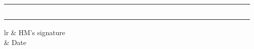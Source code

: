 \documentclass[12pt]{article}
\begin{document}
\begin{longtable}{|l|p{2.75cm}|p{2.75cm}|p{2.75cm}|l|p{1.5cm}|l|l|l|l|l|l|l|l|l|l|l|l|l|l|l|l|l|l|l|l|l|l|l|l|l|}
\rule{0cm}{0.75cm} & \relax & \relax & \relax & \relax & \relax & \relax & & & & & & & & & & & & & & & & & & & & & & & &\\ \hline
\rule{0cm}{0.75cm} & \relax & \relax & \relax & \relax & \relax & \relax & & & & & & & & & & & & & & & & & & & & & & & &\\ \hline
\rule{0cm}{0.75cm} & \relax & \relax & \relax & \relax & \relax & \relax & & & & & & & & & & & & & & & & & & & & & & & &\\ \hline
\rule{0cm}{0.75cm} & \relax & \relax & \relax & \relax & \relax & \relax & & & & & & & & & & & & & & & & & & & & & & & &\\ \hline
\rule{0cm}{0.75cm} & \relax & \relax & \relax & \relax & \relax & \relax & & & & & & & & & & & & & & & & & & & & & & & &\\ \hline
\rule{0cm}{0.75cm} & \relax & \relax & \relax & \relax & \relax & \relax & & & & & & & & & & & & & & & & & & & & & & & &\\ \hline
\end{longtable}



    \begin{tabular}{lr}
     & HM's signature \\
    & Date
    \end{tabular}
  
\end{document}
